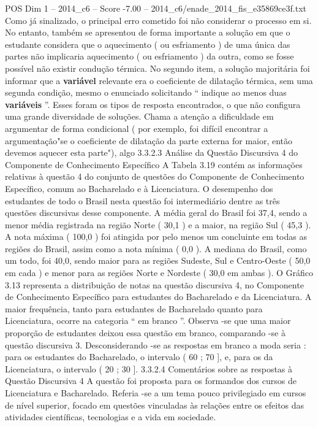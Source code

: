 \begin{textsample}{POS Dim 1 – 2014\_c6 – Score -7.00 – 2014\_c6/enade\_2014\_fis\_e35869ce3f.txt}
Como já sinalizado, o principal erro cometido foi não considerar o processo em si.
No entanto, também se apresentou de forma importante a solução em que o estudante considera que o aquecimento ( ou esfriamento ) de uma única das partes não implicaria aquecimento ( ou esfriamento ) da outra, como se fosse possível não existir condução térmica.
No segundo item, a solução majoritária foi informar que a \textbf{variável} relevante era o coeficiente de dilatação térmica, sem uma segunda condição, mesmo o enunciado solicitando “ indique ao menos duas \textbf{variáveis} ”.
Esses foram os tipos de resposta encontrados, o que não configura uma grande diversidade de soluções.
Chama a atenção a dificuldade em argumentar de forma condicional ( por exemplo, foi difícil encontrar a argumentação"se o coeficiente de dilatação da parte externa for maior, então devemos aquecer esta parte"), algo 3.3.2.3 Análise da Questão Discursiva 4 do Componente de Conhecimento Específico A Tabela 3.19 contém as informações relativas à questão 4 do conjunto de questões do Componente de Conhecimento Específico, comum ao Bacharelado e à Licenciatura.
O desempenho dos estudantes de todo o Brasil nesta questão foi intermediário dentre as três questões discursivas desse componente.
A média geral do Brasil foi 37,4, sendo a menor média registrada na região Norte ( 30,1 ) e a maior, na região Sul ( 45,3 ).
A nota máxima ( 100,0 ) foi atingida por pelo menos um concluinte em todas as regiões do Brasil, assim como a nota mínima ( 0,0 ).
A mediana do Brasil, como um todo, foi 40,0, sendo maior para as regiões Sudeste, Sul e Centro-Oeste ( 50,0 em cada ) e menor para as regiões Norte e Nordeste ( 30,0 em ambas ).
O Gráfico 3.13 representa a distribuição de notas na questão discursiva 4, no Componente de Conhecimento Específico para estudantes do Bacharelado e da Licenciatura.
A maior frequência, tanto para estudantes de Bacharelado quanto para Licenciatura, ocorre na categoria “ em branco ”.
Observa -se que uma maior proporção de estudantes deixou essa questão em branco, comparando -se à questão discursiva 3.
Desconsiderando -se as respostas em branco a moda seria : para os estudantes do Bacharelado, o intervalo ( 60 ; 70 ], e, para os da Licenciatura, o intervalo ( 20 ; 30 ]. 3.3.2.4 Comentários sobre as respostas à Questão Discursiva 4 A questão foi proposta para os formandos dos cursos de Licenciatura e Bacharelado.
Referia -se a um tema pouco privilegiado em cursos de nível superior, focado em questões vinculadas às relações entre os efeitos das atividades científicas, tecnologias e a vida em sociedade.

\end{textsample}
